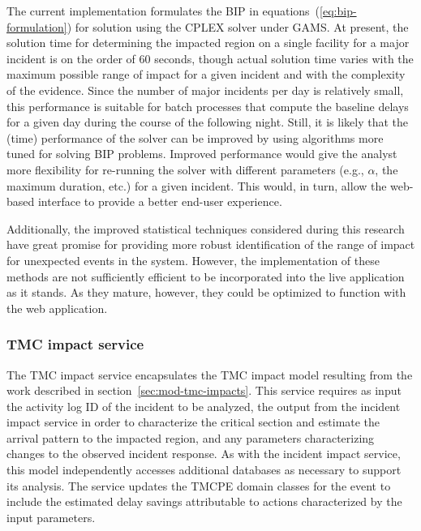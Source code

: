 \documentclass[12pt]{report}
\renewcommand{\fixme}[3][]{#1\xspace}
\newcounter{time}
\newcounter{space}
\begin{document}


The current implementation formulates the \ac{BIP} in
equations~(\ref{eq:bip-formulation}) for solution using the \ac{CPLEX} solver
under \ac{GAMS}.  At present, the solution time for determining the impacted
region on a single facility for a major incident is on the order of 60 seconds,
though actual solution time varies with the maximum possible range of impact for
a given incident and with the complexity of the evidence.  Since the number of
major incidents per day is relatively small, this performance is suitable for
batch processes that compute the baseline delays for a given day during the
course of the following night.  Still, it is likely that the (time) performance
of the solver can be improved by using algorithms more tuned for solving
\ac{BIP} problems.  Improved performance would give the analyst more flexibility
for re-running the solver with different parameters (e.g., $\alpha$, the maximum
duration, etc.) for a given incident.  This would, in turn, allow the web-based
interface to provide a better end-user experience.

Additionally, the improved statistical techniques considered during this
research
have great promise for providing more robust identification of the range of
impact for unexpected events in the system.  However, the implementation of
these methods are not sufficiently efficient to be incorporated into the live
application as it stands.  As they mature, however, they could be optimized to
function with the web application.


\subsubsection{TMC impact service}
\label{sec:tmc-impact-service}
The \ac{TMC} impact service encapsulates the \ac{TMC} impact model
resulting from the work described in
section~\ref{sec:mod-tmc-impacts}.  This service requires as input the
activity log ID of the incident to be analyzed, the output from the
incident impact service in order to characterize the critical section
and estimate the arrival pattern to the impacted region, and any
parameters characterizing changes to the observed incident
response. As with the incident impact service, this model
independently accesses additional databases as necessary to support
its analysis.  The service updates the \ac{TMCPE} domain classes for
the event to include the estimated delay savings attributable to
actions characterized by the input parameters.
\end{document}
